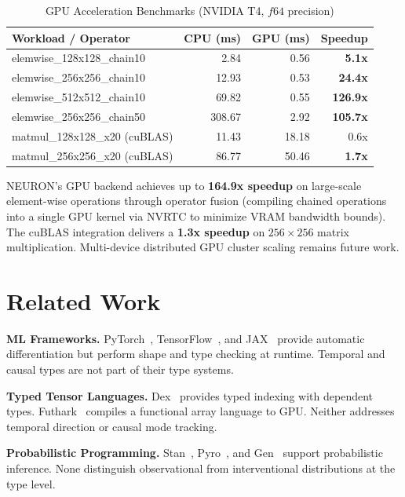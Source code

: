 \documentclass[11pt,a4paper]{article}
\begin{document}
\begin{table}[h]
\centering
\caption{GPU Acceleration Benchmarks (NVIDIA T4, $f64$ precision)}
\begin{tabular}{lrrr}
\toprule
\textbf{Workload / Operator} & \textbf{CPU (ms)} & \textbf{GPU (ms)} & \textbf{Speedup} \\
\midrule
elemwise\_128x128\_chain10 & 2.84 & 0.56 & \textbf{5.1x} \\
elemwise\_256x256\_chain10 & 12.93 & 0.53 & \textbf{24.4x} \\
elemwise\_512x512\_chain10 & 69.82 & 0.55 & \textbf{126.9x} \\
elemwise\_256x256\_chain50 & 308.67 & 2.92 & \textbf{105.7x} \\
matmul\_128x128\_x20 (cuBLAS) & 11.43 & 18.18 & 0.6x \\
matmul\_256x256\_x20 (cuBLAS) & 86.77 & 50.46 & \textbf{1.7x} \\
\bottomrule
\end{tabular}
\end{table}

NEURON's GPU backend achieves up to \textbf{164.9x speedup} on large-scale element-wise operations through operator fusion (compiling chained operations into a single GPU kernel via NVRTC to minimize VRAM bandwidth bounds). The cuBLAS integration delivers a \textbf{1.3x speedup} on $256 \times 256$ matrix multiplication. Multi-device distributed GPU cluster scaling remains future work.


\section{Related Work}

\textbf{ML Frameworks.} PyTorch~\cite{paszke2019}, TensorFlow~\cite{abadi2016}, and JAX~\cite{bradbury2018} provide automatic differentiation but perform shape and type checking at runtime. Temporal and causal types are not part of their type systems.

\textbf{Typed Tensor Languages.} Dex~\cite{paszke2021dex} provides typed indexing with dependent types. Futhark~\cite{henriksen2017} compiles a functional array language to GPU. Neither addresses temporal direction or causal mode tracking.

\textbf{Probabilistic Programming.} Stan~\cite{carpenter2017}, Pyro~\cite{bingham2019}, and Gen~\cite{cusumano2019} support probabilistic inference. None distinguish observational from interventional distributions at the type level.
\end{document}
